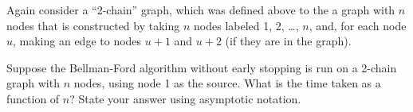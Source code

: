 \begin{prob}
    Again consider a ``2-chain'' graph, which was defined above to the a graph
    with $n$ nodes that is constructed by taking $n$ nodes labeled 1, 2, \ldots,
    $n$, and, for each node $u$, making an edge to nodes $u + 1$ and $u + 2$
    (if they are in the graph).

    Suppose the Bellman-Ford algorithm without early stopping is run on a
    2-chain graph with $n$ nodes, using node 1 as the source. What is the time
    taken as a function of $n$? State your answer using asymptotic notation.


\end{prob}
